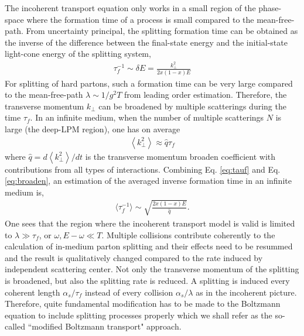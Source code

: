 \documentclass[aps, prc, reprint, amsmath, groupedaddress, nofootinbib]{revtex4-1}
\begin{document}
The incoherent transport equation only works in a small region of the phase-space where the formation time of a process is small compared to the mean-free-path.
From uncertainty principal, the splitting formation time can be obtained as the inverse of the difference between the final-state energy and the initial-state light-cone energy of the splitting system,
\begin{eqnarray}
\tau_f^{-1} \sim \delta E = \frac{k_\perp^2}{2x(1-x)E} 
\label{eq:tauf}
\end{eqnarray}
For splitting of hard partons, such a formation time can be very large compared to the mean-free-path $\lambda \sim 1/g^2T$ from leading order estimation.
Therefore, the transverse momentum $k_\perp$ can be broadened by multiple scatterings during the time $\tau_f$.
In an infinite medium, when the number of multiple scatterings $N$ is large (the deep-LPM region), one has on average
\begin{eqnarray}
\left\langle k_\perp^2 \right\rangle \approx \hat{q} \tau_f \label{eq:broaden}
\end{eqnarray}
where $\hat{q} = d \left\langle k_\perp^2 \right\rangle / dt$ is the transverse momentum broaden coefficient with contributions from all types of interactions.
Combining Eq. \ref{eq:tauf} and Eq. \ref{eq:broaden}, an estimation of the averaged inverse formation time in an infinite medium is,
\begin{eqnarray}
\langle \tau_f^{-1} \rangle \sim \sqrt{\frac{2x(1-x)E}{\hat{q}}}.
\label{eq:tauf-sf}
\end{eqnarray}
One sees that the region where the incoherent transport model is valid is limited to $\lambda \gg \tau_f$, or $\omega, E-\omega \ll T$.
Multiple collisions contribute coherently to the calculation of in-medium parton splitting and their effects need to be resummed and the result is qualitatively changed compared to the rate induced by independent scattering center.
Not only the transverse momentum of the splitting is broadened, but also the splitting rate is reduced. 
A splitting is induced every coherent length $\alpha_s/\tau_f$ instead of every collision $\alpha_s/\lambda$ as in the incoherent picture.
Therefore, quite fundamental modification has to be made to the Boltzmann equation to include splitting processes properly which we shall refer as the so-called ``modified Boltzmann transport" approach.
\end{document}
